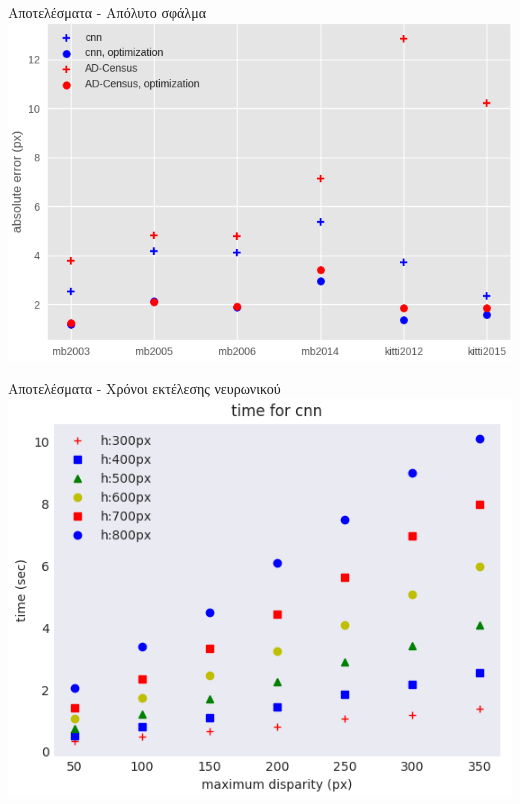 \documentclass[english,greek]{beamer}
\begin{document}
\begin{frame}{Αποτελέσματα - Απόλυτο σφάλμα}
\centering
\includegraphics[scale=0.4]{absolute_error.png}
\end{frame}

\begin{frame}{Αποτελέσματα - Χρόνοι εκτέλεσης νευρωνικού}
\centering
\includegraphics[scale=0.45]{cnn_times.png}
\end{frame}
\end{document}
